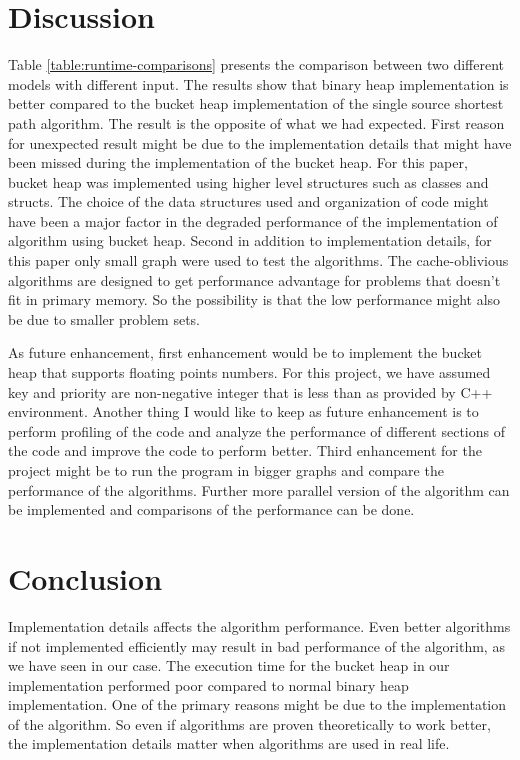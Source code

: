 \documentclass[final,3p]{CSP}
\begin{document}
    \section{Discussion}
    Table \ref{table:runtime-comparisons} presents the comparison between two different models with different input. The results show that binary heap implementation is better compared to the bucket heap implementation of the single source shortest path algorithm. The result is the opposite of what we had expected. First reason for unexpected result might be due to the implementation details that might have been missed during the implementation of the bucket heap. For this paper, bucket heap was implemented using higher level structures such as classes and structs. The choice of the data structures used and organization of code might have been a major factor in the degraded performance of the implementation of algorithm using bucket heap. Second in addition to implementation details, for this paper only small graph were used to test the algorithms. The cache-oblivious algorithms are designed to get performance advantage for problems that doesn't fit in primary memory. So the possibility is that the low performance might also be due to smaller problem sets.

    As future enhancement, first enhancement would be to implement the bucket heap that supports floating points numbers. For this project, we have assumed key and priority are non-negative integer that is less than   as provided by C++ environment. Another thing I would like to keep as future enhancement is to perform profiling of the code and analyze the performance of different sections of the code and improve the code to perform better. Third enhancement for the project might be to run the program in bigger graphs and compare the performance of the algorithms. Further more parallel version of the algorithm can be implemented and comparisons of the performance can be done.

    \section{Conclusion}
    Implementation details affects the algorithm performance. Even better algorithms if not implemented efficiently may result in bad performance of the algorithm, as we have seen in our case. The execution time for the bucket heap in our implementation performed poor compared to normal binary heap implementation. One of the primary reasons might be due to the implementation of the algorithm. So even if algorithms are proven theoretically to work better, the implementation details matter when algorithms are used in real life.

    \it
    
\end{document}
